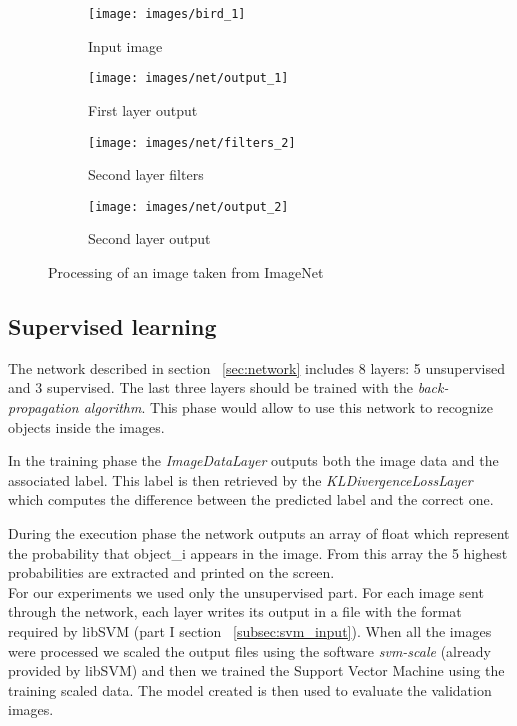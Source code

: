 \begin{figure*}[hbtp]\centering
\centering
\begin{subfigure}[t]{.4\textwidth}
    \centering
    \texttt{[image: images/bird\_1]}
    \caption{Input image}
    \label{fig:output1b}
\end{subfigure}%
\begin{subfigure}[t]{.4\textwidth}
    \centering
    \texttt{[image: images/net/output\_1]}
    \caption{First layer output}
    \label{fig:output2b}
\end{subfigure}
\begin{subfigure}[t]{.4\textwidth}
    \centering
    \texttt{[image: images/net/filters\_2]}
    \caption{Second layer filters}
    \label{fig:output3b}
\end{subfigure}%
\begin{subfigure}[t]{.4\textwidth}
    \centering
    \texttt{[image: images/net/output\_2]}
    \caption{Second layer output}
    \label{fig:output3boh}
\end{subfigure}
\caption{Processing of an image taken from ImageNet}
\label{fig:outputb}
\end{figure*}

\subsection{Supervised learning}

The network described in section ~\ref{sec:network} includes 8 layers: 5 unsupervised and 3 supervised. The last three layers should be trained with the \textit{back-propagation algorithm}. This phase would allow to use this network to recognize objects inside the images.

In the training phase the \textit{ImageDataLayer} outputs both the image data and the associated label. This label is then retrieved by the \textit{KLDivergenceLossLayer} which computes the difference between the predicted label and the correct one.

During the execution phase the network outputs an array of float which represent the probability that object\_i appears in the image. From this array the 5 highest probabilities are extracted and printed on the screen.\\

For our experiments we used only the unsupervised part. For each image sent through the network, each layer writes its output in a file with the format required by libSVM (part I section ~\ref{subsec:svm_input}).
When all the images were processed we scaled the output files using the software \textit{svm-scale} (already provided by libSVM) and then we trained the Support Vector Machine using the training scaled data. The model created is then used to evaluate the validation images.

